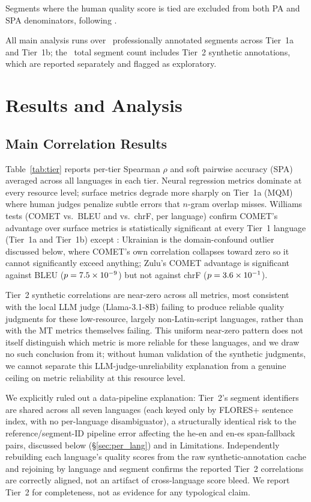 \documentclass[11pt]{article}
\begin{document}
Segments where the human quality score is tied are excluded from both PA and SPA denominators, following \citet{deutsch2023ties}.

All main analysis runs over \TierOneTotalSegments\ professionally annotated segments across Tier~1a and Tier~1b; the \TotalSegments\ total segment count includes Tier~2 synthetic annotations, which are reported separately and flagged as exploratory.

\section{Results and Analysis}
\label{sec:results}

\subsection{Main Correlation Results}

Table~\ref{tab:tier} reports per-tier Spearman $\rho$ and soft pairwise accuracy (SPA) averaged across all languages in each tier. Neural regression metrics dominate at every resource level; surface metrics degrade more sharply on Tier~1a (MQM) where human judges penalize subtle errors that $n$-gram overlap misses. Williams tests (COMET vs.\ BLEU and vs.\ chrF, per language) confirm COMET's advantage over surface metrics is statistically significant at every Tier~1 language (Tier~1a and Tier~1b) except \WilliamsTierOneExceptionLangs: Ukrainian is the domain-confound outlier discussed below, where COMET's own correlation collapses toward zero so it cannot significantly exceed anything; Zulu's COMET advantage is significant against BLEU ($p=7.5\times10^{-9}$) but not against chrF ($p=3.6\times10^{-1}$).

Tier~2 synthetic correlations are near-zero across all metrics, most consistent with the local LLM judge (Llama-3.1-8B) failing to produce reliable quality judgments for these low-resource, largely non-Latin-script languages, rather than with the MT metrics themselves failing. This uniform near-zero pattern does not itself distinguish which metric is more reliable for these languages, and we draw no such conclusion from it; without human validation of the synthetic judgments, we cannot separate this LLM-judge-unreliability explanation from a genuine ceiling on metric reliability at this resource level.

We explicitly ruled out a data-pipeline explanation: Tier~2's segment identifiers are shared across all seven languages (each keyed only by FLORES+ sentence index, with no per-language disambiguator), a structurally identical risk to the reference/segment-ID pipeline error affecting the he-en and en-es span-fallback pairs, discussed below (\S\ref{sec:per_lang}) and in Limitations. Independently rebuilding each language's quality scores from the raw synthetic-annotation cache and rejoining by language and segment confirms the reported Tier~2 correlations are correctly aligned, not an artifact of cross-language score bleed. We report Tier~2 for completeness, not as evidence for any typological claim.
\end{document}
